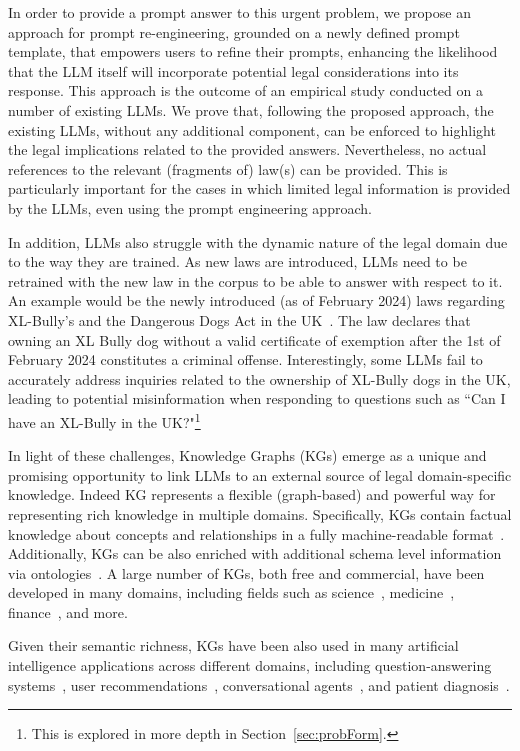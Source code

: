 \documentclass[sn-mathphys-num]{sn-jnl}%
\begin{document}
In order to provide a prompt answer to this urgent problem, we propose an approach for prompt re-engineering, grounded on a newly defined prompt template,  that empowers users to refine their prompts, enhancing the likelihood that the LLM itself will incorporate potential legal considerations into its response. This approach is the outcome of an empirical study conducted on a number of existing LLMs. We prove that, following the proposed approach, the existing LLMs, without any additional component, can be enforced to highlight the legal implications related to the provided answers. Nevertheless, no actual references to the relevant (fragments of) law(s) can be provided. This is particularly important for the cases in which limited legal information is provided by the LLMs, even using the prompt engineering approach.

In addition, LLMs also struggle with the dynamic nature of the legal domain due to the way they are trained. As new laws are introduced, LLMs need to be retrained with the new law in the corpus to be able to answer with respect to it. 
An example would be the newly introduced (as of February 2024) laws regarding XL-Bully's and the Dangerous Dogs Act in the UK~\cite{uk2023n1164}.
The law %
declares that owning an XL Bully dog without a valid certificate of exemption after the 1st of February 2024 constitutes a criminal offense. Interestingly, some LLMs fail to accurately address inquiries related to the ownership of XL-Bully dogs in the UK, leading to potential misinformation when responding to questions such as ``Can I have an XL-Bully in the UK?"\footnote{This is explored in more depth in Section~\ref{sec:probForm}.}

In light of these challenges, Knowledge Graphs (KGs) emerge as a unique and promising opportunity to link LLMs to an external source of legal domain-specific knowledge. Indeed KG represents a flexible (graph-based) and powerful way for representing rich knowledge in multiple domains. Specifically, KGs contain factual knowledge about concepts and relationships in a fully machine-readable format~\cite{hogan2021knowledge}. Additionally, KGs can be also enriched with additional schema level information via ontologies~\cite{hogan2021knowledge}. A large number of KGs, both free and commercial, have been developed in many domains, including fields such as science~\cite{mccusker2020nanomine}, medicine~\cite{belleau2008bio2rdf}, finance~\cite{li2023findkg}, and more.

Given their semantic richness, KGs have been also used in many artificial intelligence applications across different domains, including question-answering systems~\cite{zhang2018variational}, user recommendations~\cite{wang2019kgat}, conversational agents~\cite{meloni2023integrating}, and patient diagnosis~\cite{chai2020diagnosis}.
\end{document}
